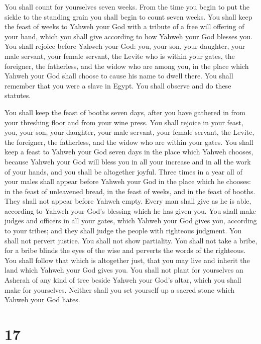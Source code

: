  You shall count for yourselves seven weeks. From the time
you begin to put the sickle to the standing grain you shall begin to
count seven weeks.  You shall keep the feast of weeks to
Yahweh your God with a tribute of a free will offering of your hand,
which you shall give according to how Yahweh your God blesses you.
 You shall rejoice before Yahweh your God: you, your son,
your daughter, your male servant, your female servant, the Levite who is
within your gates, the foreigner, the fatherless, and the widow who are
among you, in the place which Yahweh your God shall choose to cause his
name to dwell there.  You shall remember that you were a
slave in Egypt. You shall observe and do these statutes.

 You shall keep the feast of booths seven days, after you
have gathered in from your threshing floor and from your wine press.
 You shall rejoice in your feast, you, your son, your
daughter, your male servant, your female servant, the Levite, the
foreigner, the fatherless, and the widow who are within your gates.
 You shall keep a feast to Yahweh your God seven days in
the place which Yahweh chooses, because Yahweh your God will bless you
in all your increase and in all the work of your hands, and you shall be
altogether joyful.  Three times in a year all of your
males shall appear before Yahweh your God in the place which he chooses:
in the feast of unleavened bread, in the feast of weeks, and in the
feast of booths. They shall not appear before Yahweh empty.
 Every man shall give as he is able, according to Yahweh
your God's blessing which he has given you.  You shall
make judges and officers in all your gates, which Yahweh your God gives
you, according to your tribes; and they shall judge the people with
righteous judgment.  You shall not pervert justice. You
shall not show partiality. You shall not take a bribe, for a bribe
blinds the eyes of the wise and perverts the words of the righteous.
 You shall follow that which is altogether just, that you
may live and inherit the land which Yahweh your God gives you.
 You shall not plant for yourselves an Asherah of any
kind of tree beside Yahweh your God's altar, which you shall make for
yourselves.  Neither shall you set yourself up a sacred
stone which Yahweh your God hates.

\hypertarget{section-16}{%
\section{17}\label{section-16}}


